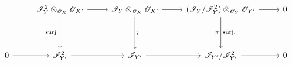 \[
\begin{tikzcd}[column sep=2.5em, row sep=3.8em]
 &
 \mathscr I_Y^2\otimes_{\mathscr O_X}\mathscr O_{X'}
   \arrow[r]
   \arrow[d,"\mathrm{surj.}"']
 &
 \mathscr I_Y\otimes_{\mathscr O_X}\mathscr O_{X'}
   \arrow[r]
   \arrow[d,"\wr"]
 &
 (\mathscr I_Y/\mathscr I_Y^2)
   \otimes_{\mathscr O_Y}\mathscr O_{Y'}
   \arrow[r]
   \arrow[d,"\pi"',"{\mathrm{surj.}}"]
 &
 0
 \\
 0 \arrow[r]
 &
 \mathscr I_{Y'}^2 \arrow[r]
 &
 \mathscr I_{Y'} \arrow[r]
 &
 \mathscr I_{Y'}/\mathscr I_{Y'}^2 \arrow[r]
 &
 0
\end{tikzcd}
\]
